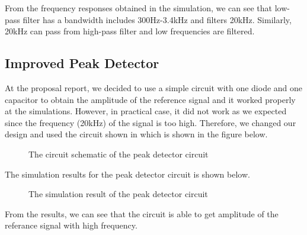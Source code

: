\documentclass[conference]{IEEEtran}
\begin{document}
From the frequency responses obtained in the simulation, we can see that low-pass filter has a bandwidth includes 300Hz-3.4kHz and filters 20kHz. 
Similarly, 20kHz can pass from high-pass filter and low frequencies are filtered. 

\subsection{Improved Peak Detector}
At the proposal report, we decided to use a simple circuit with one diode and one capacitor to obtain the amplitude 
of the reference signal and it worked properly at the simulations. However, in practical case, it did not work as we expected 
since the frequency (20kHz) of the signal is too high. Therefore, we changed our design and used the circuit shown in \cite{peak} which is 
shown in the figure below.
\begin{figure}[H]
   \centerline{}
    \caption{The circuit schematic of the peak detector circuit}
\end{figure}

The simulation results for the peak detector circuit is shown below.
\begin{figure}[H]
   \centerline{}
    \caption{The simulation result of the peak detector circuit}
\end{figure}

From the results, we can see that the circuit is able to get amplitude of the referance signal with high frequency.
\end{document}
